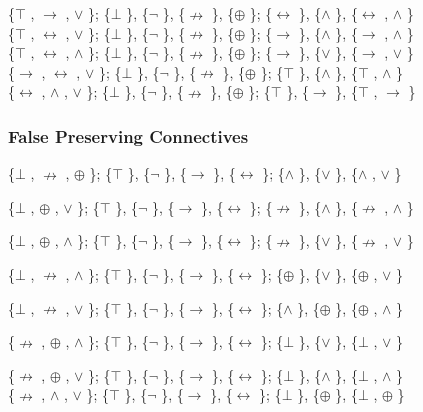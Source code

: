 \{$\top$ , $\to$ , $\lor$ \}; \{$\bot$ \}, \{$\neg$ \}, \{$\nrightarrow$ \}, \{$\oplus$ \}; \{$\leftrightarrow$ \}, \{$\land$ \}, \{$\leftrightarrow$ , $\land$ \}\\
\{$\top$ , $\leftrightarrow$ , $\lor$ \}; \{$\bot$ \}, \{$\neg$ \}, \{$\nrightarrow$ \}, \{$\oplus$ \}; \{$\to$ \}, \{$\land$ \}, \{$\to$ , $\land$ \}\\
\{$\top$ , $\leftrightarrow$ , $\land$ \}; \{$\bot$ \}, \{$\neg$ \}, \{$\nrightarrow$ \}, \{$\oplus$ \}; \{$\to$ \}, \{$\lor$ \}, \{$\to$ , $\lor$ \}\\
\{$\to$ , $\leftrightarrow$ , $\lor$ \}; \{$\bot$ \}, \{$\neg$ \}, \{$\nrightarrow$ \}, \{$\oplus$ \}; \{$\top$ \}, \{$\land$ \}, \{$\top$ , $\land$ \}\\
\{$\leftrightarrow$ , $\land$ , $\lor$ \}; \{$\bot$ \}, \{$\neg$ \}, \{$\nrightarrow$ \}, \{$\oplus$ \}; \{$\top$ \}, \{$\to$ \}, \{$\top$ , $\to$ \}

\hypertarget{false-preserving-connectives}{%
\subsubsection{False Preserving
Connectives}\label{false-preserving-connectives}}

\{$\bot$ , $\nrightarrow$ , $\oplus$ \}; \{$\top$ \}, \{$\neg$ \}, \{$\to$ \}, \{$\leftrightarrow$ \}; \{$\land$ \}, \{$\lor$ \}, \{$\land$ , $\lor$ \}

\{$\bot$ , $\oplus$ , $\lor$ \}; \{$\top$ \}, \{$\neg$ \}, \{$\to$ \}, \{$\leftrightarrow$ \}; \{$\nrightarrow$ \}, \{$\land$ \}, \{$\nrightarrow$ , $\land$ \}

\{$\bot$ , $\oplus$ , $\land$ \}; \{$\top$ \}, \{$\neg$ \}, \{$\to$ \}, \{$\leftrightarrow$ \}; \{$\nrightarrow$ \}, \{$\lor$ \}, \{$\nrightarrow$ , $\lor$ \}

\{$\bot$ , $\nrightarrow$ , $\land$ \}; \{$\top$ \}, \{$\neg$ \}, \{$\to$ \}, \{$\leftrightarrow$ \}; \{$\oplus$ \}, \{$\lor$ \}, \{$\oplus$ , $\lor$ \}

\{$\bot$ , $\nrightarrow$ , $\lor$ \}; \{$\top$ \}, \{$\neg$ \}, \{$\to$ \}, \{$\leftrightarrow$ \}; \{$\land$ \}, \{$\oplus$ \}, \{$\oplus$ , $\land$ \}

\{$\nrightarrow$ , $\oplus$ , $\land$ \}; \{$\top$ \}, \{$\neg$ \}, \{$\to$ \}, \{$\leftrightarrow$ \}; \{$\bot$ \}, \{$\lor$ \}, \{$\bot$ , $\lor$ \}

\{$\nrightarrow$ , $\oplus$ , $\lor$ \}; \{$\top$ \}, \{$\neg$ \}, \{$\to$ \}, \{$\leftrightarrow$ \}; \{$\bot$ \}, \{$\land$ \}, \{$\bot$ , $\land$ \}\\
\{$\nrightarrow$ , $\land$ , $\lor$ \}; \{$\top$ \}, \{$\neg$ \}, \{$\to$ \}, \{$\leftrightarrow$ \}; \{$\bot$ \}, \{$\oplus$ \}, \{$\bot$ , $\oplus$ \}

